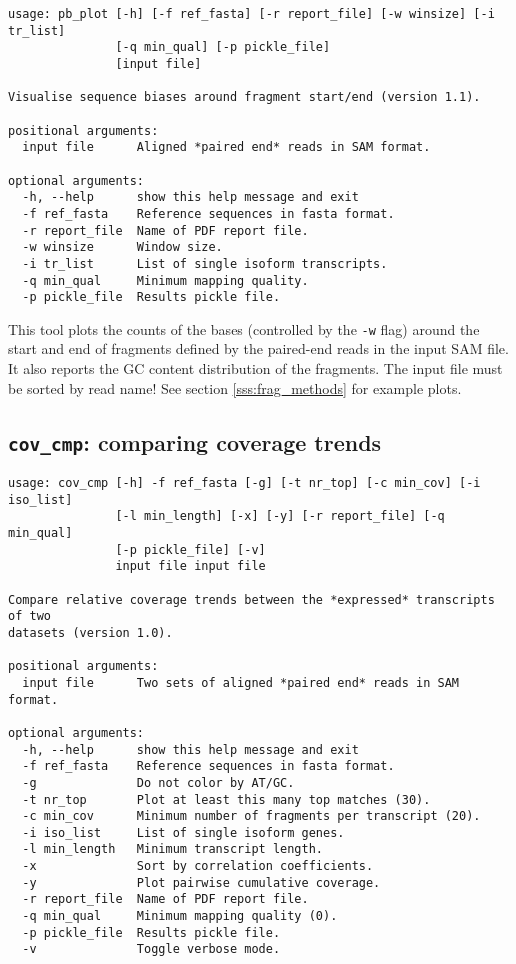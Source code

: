\begin{verbatim}
usage: pb_plot [-h] [-f ref_fasta] [-r report_file] [-w winsize] [-i tr_list]
               [-q min_qual] [-p pickle_file]
               [input file]

Visualise sequence biases around fragment start/end (version 1.1).

positional arguments:
  input file      Aligned *paired end* reads in SAM format.

optional arguments:
  -h, --help      show this help message and exit
  -f ref_fasta    Reference sequences in fasta format.
  -r report_file  Name of PDF report file.
  -w winsize      Window size.
  -i tr_list      List of single isoform transcripts.
  -q min_qual     Minimum mapping quality.
  -p pickle_file  Results pickle file.
\end{verbatim}

This tool plots the counts of the bases (controlled by the \texttt{-w} flag) around the start and end of fragments defined by the paired-end reads in the input SAM file. It also reports the GC content distribution of the fragments. The input file must be sorted by read name!
See section \ref{sss:frag_methods} for example plots.

\subsection{{\tt cov\_cmp}: comparing coverage trends}

\begin{verbatim}
usage: cov_cmp [-h] -f ref_fasta [-g] [-t nr_top] [-c min_cov] [-i iso_list]
               [-l min_length] [-x] [-y] [-r report_file] [-q min_qual]
               [-p pickle_file] [-v]
               input file input file

Compare relative coverage trends between the *expressed* transcripts of two
datasets (version 1.0).

positional arguments:
  input file      Two sets of aligned *paired end* reads in SAM format.

optional arguments:
  -h, --help      show this help message and exit
  -f ref_fasta    Reference sequences in fasta format.
  -g              Do not color by AT/GC.
  -t nr_top       Plot at least this many top matches (30).
  -c min_cov      Minimum number of fragments per transcript (20).
  -i iso_list     List of single isoform genes.
  -l min_length   Minimum transcript length.
  -x              Sort by correlation coefficients.
  -y              Plot pairwise cumulative coverage.
  -r report_file  Name of PDF report file.
  -q min_qual     Minimum mapping quality (0).
  -p pickle_file  Results pickle file.
  -v              Toggle verbose mode.
\end{verbatim}

